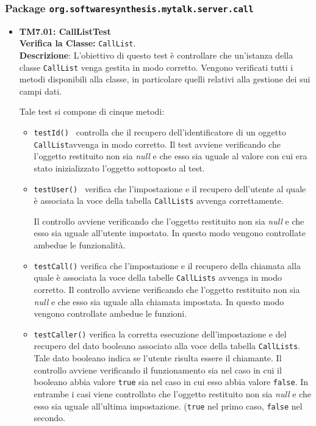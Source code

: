 \subsubsection{Package \texttt{org.softwaresynthesis.mytalk.server.call}}
\begin{itemize}
\item[\passed] \textbf{TM7.01: CallListTest}\\
\textbf{Verifica la Classe:} \texttt{CallList}.\\
\textbf{Descrizione}: L'obiettivo di questo test è controllare che un'istanza della classe  \texttt{CallList} venga gestita in modo corretto. Vengono verificati tutti i metodi disponibili alla classe, in particolare quelli relativi alla gestione dei sui campi dati.

Tale test si compone di cinque metodi:
\begin{itemize}
\item \texttt{testId() } controlla che il recupero dell'identificatore di un oggetto \texttt{CallList}avvenga in modo corretto. 
Il test avviene verificando che l'oggetto restituito non sia \textit{null} e che esso sia uguale al valore con cui era stato inizializzato l'oggetto sottoposto al test.

\item \texttt{testUser() } verifica che l'impostazione e il recupero dell'utente al quale è associata la voce della tabella \texttt{CallLists} avvenga correttamente. 

Il controllo avviene verificando che l'oggetto restituito non sia \textit{null} e che esso sia uguale all'utente impostato. In questo modo vengono controllate ambedue le funzionalità.

\item \texttt{testCall()} verifica che l'impostazione e il recupero della chiamata alla quale è associata la voce della tabelle \texttt{CallLists} avvenga in modo corretto. Il controllo avviene verificando che l'oggetto restituito non sia \textit{null} e che esso sia uguale alla chiamata impostata. In questo modo vengono controllate ambedue le funzioni.

\item \texttt{testCaller()} verifica la corretta esecuzione  dell'impostazione e del recupero del dato booleano associato alla voce della tabella \texttt{CallLists}. Tale dato booleano indica se l'utente risulta essere il chiamante.
Il controllo avviene verificando il funzionamento sia nel caso in cui il booleano abbia valore \texttt{true} sia nel caso in cui esso abbia valore \texttt{false}.
In entrambe i casi viene controllato che l'oggetto restituito non sia \textit{null} e che esso sia uguale all'ultima impostazione. (\texttt{true} nel primo caso, \texttt{false} nel secondo.


\end{itemize}
\end{itemize}
